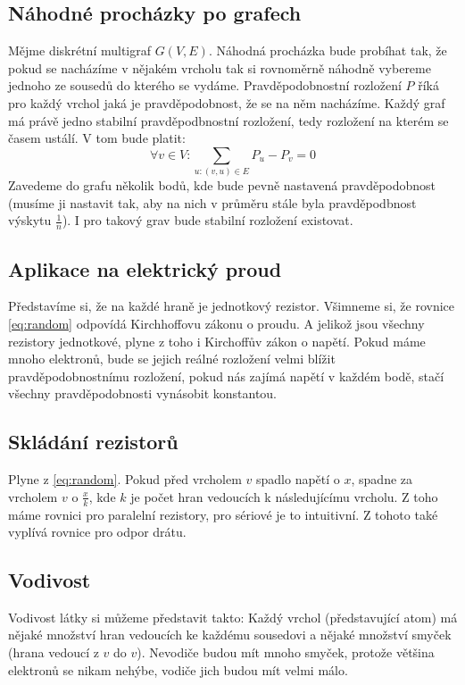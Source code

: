 \documentclass[titlepage]{book}
\begin{document}
\subsection{Náhodné procházky po grafech}
Mějme diskrétní multigraf $G(V,E)$. Náhodná procházka bude probíhat tak, že pokud se nacházíme v nějakém vrcholu tak si rovnoměrně náhodně vybereme jednoho ze sousedů do kterého se vydáme. Pravděpodobnostní rozložení $P$ říká pro každý vrchol jaká je pravděpodobnost, že se na něm nacházíme. Každý graf má právě jedno stabilní pravděpodbnostní rozložení, tedy rozložení na kterém se časem ustálí. V tom bude platit:\\
\begin{equation}\label{eq:random}
\forall v \in V: \sum_{u: (v,u) \in E} P_u - P_v = 0
\end{equation}
Zavedeme do grafu několik bodů, kde bude pevně nastavená pravděpodobnost (musíme ji nastavit tak, aby na nich v průměru stále byla pravděpodbnost výskytu $\frac{1}{n}$). I pro takový grav bude stabilní rozložení existovat.
\subsection{Aplikace na elektrický proud}
Představíme si, že na každé hraně je jednotkový rezistor. Všimneme si, že rovnice \ref{eq:random} odpovídá Kirchhoffovu zákonu o proudu. A jelikož jsou všechny rezistory jednotkové, plyne z toho i Kirchoffův zákon o napětí. Pokud máme mnoho elektronů, bude se jejich reálné rozložení velmi blížit pravděpodobnostnímu rozložení, pokud nás zajímá napětí v každém bodě, stačí všechny pravděpodobnosti vynásobit konstantou.
\subsection{Skládání rezistorů}
Plyne z \ref{eq:random}. Pokud před vrcholem $v$ spadlo napětí o $x$, spadne za vrcholem $v$ o $\frac{x}{k}$, kde $k$ je počet hran vedoucích k následujícímu vrcholu. Z toho máme rovnici pro paralelní rezistory, pro sériové je to intuitivní. Z tohoto také vyplívá rovnice pro odpor drátu.
\subsection{Vodivost}
Vodivost látky si můžeme představit takto: Každý vrchol (představující atom) má nějaké množství hran vedoucích ke každému sousedovi a nějaké množství smyček (hrana vedoucí z $v$ do $v$). Nevodiče budou mít mnoho smyček, protože většina elektronů se nikam nehýbe, vodiče jich budou mít velmi málo.
\end{document}
